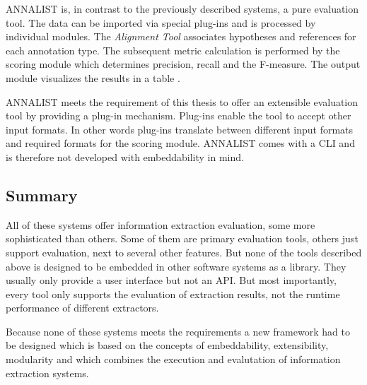 ANNALIST is, in contrast to the previously described systems, a pure evaluation tool. The data can be imported via special plug-ins and is processed by individual modules. The \textit{Alignment Tool} associates hypotheses and references for each annotation type. The subsequent metric calculation is performed by the scoring module which determines precision, recall and the F-measure. The output module visualizes the results in a table \cite{Linsmayr:2010}.

ANNALIST meets the requirement of this thesis to offer an extensible evaluation tool by providing a plug-in mechanism. Plug-ins enable the tool to accept other input formats. In other words plug-ins translate between different input formats and required formats for the scoring module. ANNALIST comes with a \gls{CLI} and is therefore not developed with embeddability in mind.

\subsection{Summary}
All of these systems offer information extraction evaluation, some more sophisticated than others. Some of them are primary evaluation tools, others just support evaluation, next to several other features. But none of the tools described above is designed to be embedded in other software systems as a library. They usually only provide a user interface but not an \gls{API}. But most importantly, every tool only supports the evaluation of extraction results, not the runtime performance of different extractors.

Because none of these systems meets the requirements a new framework had to be designed which is based on the concepts of embeddability, extensibility, modularity and which combines the execution and evalutation of information extraction systems.